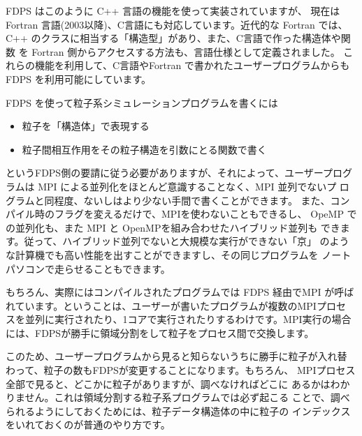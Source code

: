 FDPS はこのように C++ 言語の機能を使って実装されていますが、
現在はFortran 言語(2003以降)、C言語にも対応しています。近代的な Fortran では、
C++ のクラスに相当する「構造型」があり、また、C言語で作った構造体や関数
を Fortran 側からアクセスする方法も、言語仕様として定義されました。
これらの機能を利用して、C言語やFortran で書かれたユーザープログラムからも
FDPS を利用可能にしています。

FDPS を使って粒子系シミュレーションプログラムを書くには

\begin{itemize}

\item 粒子を「構造体」で表現する
\item 粒子間相互作用をその粒子構造を引数にとる関数で書く
\end{itemize}

というFDPS側の要請に従う必要がありますが、それによって、ユーザープログ
ラムは MPI による並列化をほとんど意識することなく、MPI 並列でないプ
ログラムと同程度、ないしはより少ない手間で書くことができます。
また、コンパイル時のフラグを変えるだけで、MPIを使わないこともできるし、
OpeMP での並列化も、また MPI と OpenMPを組み合わせたハイブリッド並列も
できます。従って、ハイブリッド並列でないと大規模な実行ができない「京」
のような計算機でも高い性能を出すことができますし、その同じプログラムを
ノートパソコンで走らせることもできます。


もちろん、実際にはコンパイルされたプログラムでは FDPS 経由でMPI が呼ば
れています。ということは、ユーザーが書いたプログラムが複数のMPIプロセ
スを並列に実行されたり、1コアで実行されたりするわけです。MPI実行の場合
には、FDPSが勝手に領域分割をして粒子をプロセス間で交換します。

このため、ユーザープログラムから見ると知らないうちに勝手に粒子が入れ替
わって、粒子の数もFDPSが変更することになります。もちろん、
MPIプロセス全部で見ると、どこかに粒子がありますが、調べなければどこに
あるかはわかりません。これは領域分割する粒子系プログラムでは必ず起こる
ことで、調べられるようにしておくためには、粒子データ構造体の中に粒子の
インデックスをいれておくのが普通のやり方です。

